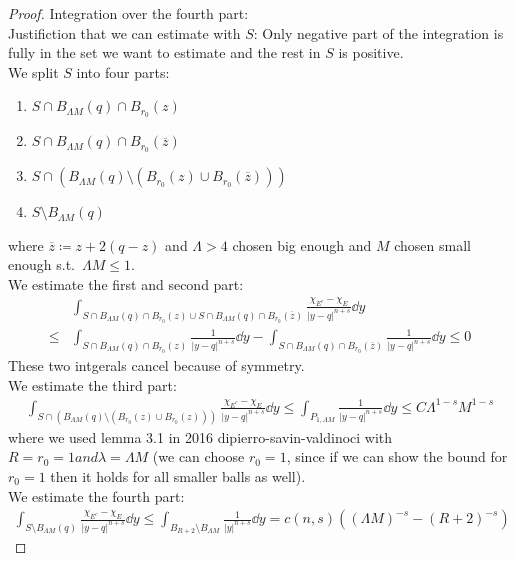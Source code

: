\begin{proof}
	Integration over the fourth part: \\
	Justifiction that we can estimate with \( S \): Only negative part of the integration
	is fully in the set we want to estimate and the rest in \( S \) is positive. \\
	We split \( S \) into four parts:
	\begin{enumerate}[label = \roman*)]
		\item \( S \cap B_{\Lambda M} (q) \cap B_{r_0}(z) \)
		\item \( S \cap B_{\Lambda M} (q) \cap B_{r_0}( \overline{z}) \)
		\item \( S \cap (B_{\Lambda M} (q)\setminus ( B_{r_0}(z) \cup
		      B_{r_0}(\overline{z}))) \)
		\item \( S \setminus B_{\Lambda M} (q) \)
	\end{enumerate}
	where \( \overline{z}\coloneqq z + 2(q-z) \) and \( \Lambda > 4 \) chosen big enough
	and \( M \) chosen small enough s.t.\ \( \Lambda M \leq 1 \). \\
	We estimate the first and second part:
	\begin{align*}
		     & \int_{S \cap B_{\Lambda M} (q) \cap B_{r_0}(z) \cup S \cap B_{\Lambda M} (q) \cap B_{r_0}(\overline{z})} \frac{\chi_{E^c}- \chi_E}{\lvert y-q\rvert^{n+s}} \dd{y} \\
		\leq & \int_{S \cap B_{\Lambda M} (q) \cap B_{r_0}(z)} \frac{1}{\lvert y-q\rvert^{n+s}} \dd{y} - \int_{S \cap B_{\Lambda M} (q) \cap B_{r_0}(\overline{z})} \frac{1}{\lvert y-q\rvert^{n+s}} \dd{y} \leq 0
	\end{align*}
	These two intgerals cancel because of symmetry. \\
	We estimate the third part:
	\begin{gather*}
		\int_{S \cap (B_{\Lambda M} (q)\setminus ( B_{r_0}(z) \cup B_{r_0}(z)))}\frac{\chi_{E^c}- \chi_E}{\lvert y-q\rvert^{n+s}} \dd{y} \leq \int_{P_{1,\Lambda M}} \frac{1}{\lvert y-q\rvert^{n+s}} \dd{y} \leq C \Lambda^{1-s} M^{1-s}
	\end{gather*}
	where we used lemma 3.1 in 2016 dipierro-savin-valdinoci with \( R = r_0 = 1 and
	\lambda = \Lambda M \) (we can choose \( r_0 = 1 \), since if we can show the bound
	for \( r_0 = 1 \) then it holds for all smaller balls as well). \\
	We estimate the fourth part:
	\begin{gather*}
		\int_{S\setminus B_{\Lambda M} (q)} \frac{\chi_{E^c}- \chi_E}{\lvert y-q\rvert^{n+s}} \dd{y} \leq \int_{B_{R+2}\setminus B_{\Lambda M}} \frac{1}{\lvert y\rvert^{n+s}} \dd{y} = c(n,s)((\Lambda M)^{-s} - (R+2)^{-s})

\end{gather*}
\end{proof}
